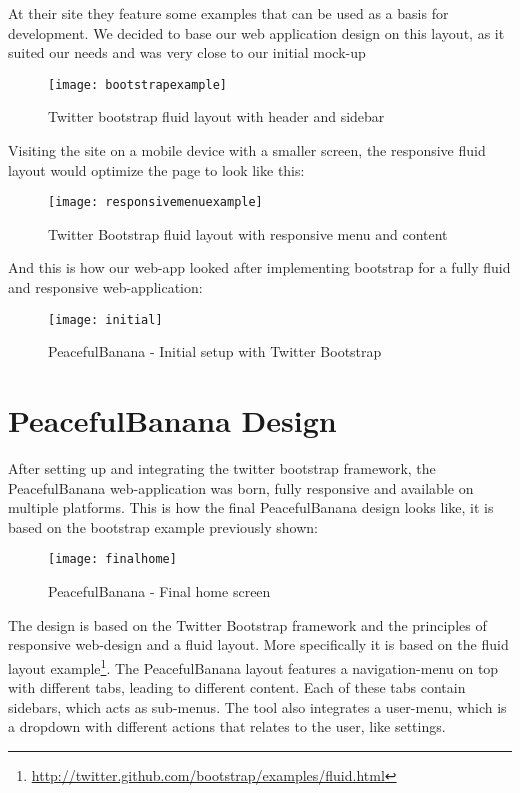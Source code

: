 At their site they feature some examples that can be used as a basis for development. We decided to base our web application design on this layout, as it suited our needs and was very close to our initial mock-up
\begin{figure}[H]
\centering
	\texttt{[image: bootstrapexample]}
\caption{Twitter bootstrap fluid layout with header and sidebar \citep{twitterbootstrap}}
\label{bootstrapexample}
\end{figure}

Visiting the site on a mobile device with a smaller screen, the responsive fluid layout would optimize the page to look like this:
\begin{figure}[H]
\centering
	\texttt{[image: responsivemenuexample]}
\caption{Twitter Bootstrap fluid layout with responsive menu and content \citep{twitterbootstrap}}
\label{bootstrapresponsive}
\end{figure}

And this is how our web-app looked after implementing bootstrap for a fully fluid and responsive web-application:
\begin{figure}[H]
\centering
	\texttt{[image: initial]}
\caption{PeacefulBanana - Initial setup with Twitter Bootstrap}
\label{teamscreen}
\end{figure}

\section{PeacefulBanana Design}
After setting up and integrating the twitter bootstrap framework, the PeacefulBanana web-application was born, fully responsive and available on multiple platforms. This is how the final PeacefulBanana design looks like, it is based on the bootstrap example previously shown:
\begin{figure}[H]
\centering
	\texttt{[image: finalhome]}
\caption{PeacefulBanana - Final home screen}
\label{finalhome}
\end{figure}
The design is based on the Twitter Bootstrap framework and the principles of responsive web-design and a fluid layout. More specifically it is based on the fluid layout example\footnote{\url{http://twitter.github.com/bootstrap/examples/fluid.html}}. The PeacefulBanana layout features a navigation-menu on top with different tabs, leading to different content. Each of these tabs contain sidebars, which acts as sub-menus. The tool also integrates a user-menu, which is a dropdown with different actions that relates to the user, like settings. 

